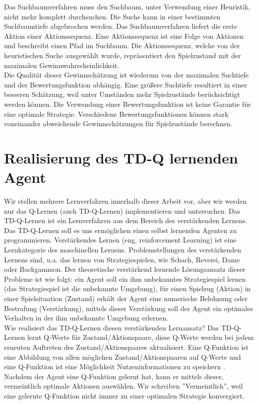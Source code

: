 Das Suchbaumverfahren muss den Suchbaum, unter Verwendung einer Heuristik, nicht mehr komplett durchsuchen. Die Suche kann in einer bestimmten Suchbaumtiefe abgebrochen werden. Das Suchbaumverfahren liefert die erste Aktion einer Aktionssequenz. Eine Aktionssequenz ist eine Folge von Aktionen und beschreibt einen Pfad im Suchbaum. Die Aktionssequenz, welche von der heuristischen Suche ausgewählt wurde, repräsentiert den Spielzustand mit der maximalen Gewinnwahrscheinlichkeit. \\

Die Qualität dieser Gewinnschätzung ist wiederum von der maximalen Suchtiefe und der Bewertungsfunktion abhängig. Eine größere Suchtiefe resultiert in einer besseren Schätzung, weil unter Umständen mehr Spielzustände berücksichtigt werden können. Die Verwendung einer Bewertungsfunktion ist keine Garantie für eine optimale Strategie. Verschiedene Bewertungsfunktionen können stark voneinander abweichende Gewinnschätzungen für Spielzustände berechnen. \\

\section{Realisierung des TD-Q lernenden Agent}
Wir stellen mehrere Lernverfahren innerhalb dieser Arbeit vor, aber wir werden nur das Q-Lernen (auch TD-Q-Lernen) implementieren und untersuchen. Das TD-Q-Lernen ist ein Lernverfahren aus dem Bereich des verstärkenden Lernens. Das TD-Q-Lernen soll es uns ermöglichen einen selbst lernenden Agenten zu programmieren. Verstärkendes Lernen (eng. reinforcement Learning) ist eine Lernkategorie des maschinellen Lernens. Problemstellungen des verstärkenden Lernens sind, u.a. das lernen von Strategiespielen, wie Schach, Reversi, Dame oder Backgammon. Der theoretische verstärkend lernende Lösungsansatz dieser Probleme ist wie folgt: ein Agent soll ein ihm unbekanntes Strategiespiel lernen (das Strategiespiel ist die unbekannte Umgebung), für einen Spielzug  (Aktion) in einer Spielsituation (Zustand) erhält der Agent eine numerische Belohnung oder Bestrafung (Verstärkung), mittels dieser Verstärkung soll der Agent ein optimales Verhalten in der ihm unbekannte Umgebung erlernen.\\

Wie realisiert das TD-Q-Lernen diesen verstärkenden Lernansatz? Das TD-Q-Lernen lernt Q-Werte für Zustand/Aktionspaare, diese Q-Werte werden bei jedem erneuten Auftreten des Zustand/Aktionspaares aktualisiert. Eine Q-Funktion ist eine Abbildung von allen möglichen Zustand/Aktionspaaren auf Q-Werte und eine Q-Funktion ist eine Möglichkeit Nutzeninformationen zu speichern \cite[974]{Russell}. Nachdem der Agent eine Q-Funktion gelernt hat, kann er mittels dieser, vermeintlich optimale Aktionen auswählen. Wir schreiben ''Vermeintlich'', weil eine gelernte Q-Funktion nicht immer zu einer optimalen Strategie konvergiert.

